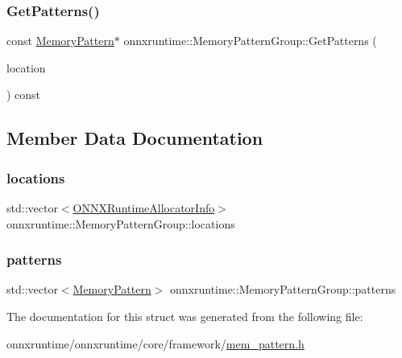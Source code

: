 \subsubsection{\texorpdfstring{Get\+Patterns()}{GetPatterns()}}
{\footnotesize\ttfamily const \mbox{\hyperlink{classonnxruntime_1_1MemoryPattern}{Memory\+Pattern}}$\ast$ onnxruntime\+::\+Memory\+Pattern\+Group\+::\+Get\+Patterns (\begin{DoxyParamCaption}\item[{const \mbox{\hyperlink{structONNXRuntimeAllocatorInfo}{O\+N\+N\+X\+Runtime\+Allocator\+Info}} \&}]{location }\end{DoxyParamCaption}) const\hspace{0.3cm}{\ttfamily [inline]}}



\subsection{Member Data Documentation}
\mbox{\label{structonnxruntime_1_1MemoryPatternGroup_ab34bfa6208cbe546b8d93c1a16744940}} 
\subsubsection{\texorpdfstring{locations}{locations}}
{\footnotesize\ttfamily std\+::vector$<$\mbox{\hyperlink{structONNXRuntimeAllocatorInfo}{O\+N\+N\+X\+Runtime\+Allocator\+Info}}$>$ onnxruntime\+::\+Memory\+Pattern\+Group\+::locations}

\mbox{\label{structonnxruntime_1_1MemoryPatternGroup_ad0f2349aae2299f7673e9f5fe3359e1d}} 
\subsubsection{\texorpdfstring{patterns}{patterns}}
{\footnotesize\ttfamily std\+::vector$<$\mbox{\hyperlink{classonnxruntime_1_1MemoryPattern}{Memory\+Pattern}}$>$ onnxruntime\+::\+Memory\+Pattern\+Group\+::patterns}



The documentation for this struct was generated from the following file\+:\begin{DoxyCompactItemize}
\item 
onnxruntime/onnxruntime/core/framework/\mbox{\hyperlink{mem__pattern_8h}{mem\+\_\+pattern.\+h}}\end{DoxyCompactItemize}
